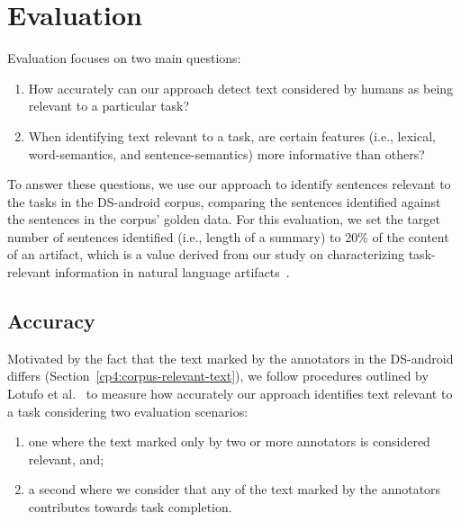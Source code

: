 \section{Evaluation}
\label{cp5:evaluation}

Evaluation focuses on two main questions:

\begin{enumerate}
    \item How accurately can our approach detect text considered by humans as being relevant to a particular task?
    
    \item When identifying text relevant to a task, are certain features (i.e., lexical, word-semantics, and sentence-semantics) more informative than others?
\end{enumerate}





To answer these questions, we use our approach to identify sentences relevant to
the tasks in the \acs{DS-android} corpus,
comparing the sentences identified against the 
sentences in the corpus' golden data. 
For this evaluation, we set the target number of sentences identified (i.e., length of a summary) to 20\% of the content of an artifact,
which is a value derived from our study on characterizing 
task-relevant information in natural language artifacts~\cite{marques2020}.





\subsection{Accuracy}


Motivated by the fact that the text marked by the annotators in the \acs{DS-android} differs
(Section~\ref{cp4:corpus-relevant-text}),
we follow procedures outlined by Lotufo et al.~\cite{Lotufo2012}
to measure how accurately our approach identifies text relevant to a task considering two evaluation scenarios:


\begin{enumerate}
    \item one where the text marked only by two or more annotators is considered relevant, and;
    
    \item a second where we consider that any of the text marked by the annotators contributes towards task completion.
\end{enumerate}

